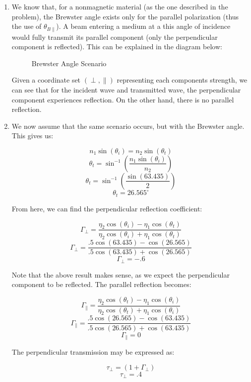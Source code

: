 \begin{enumerate}
\begin{enumerate}
      \item 

        We know that, for a nonmagnetic material (as the one described in the problem), the Brewster angle exists only for the parallel polarization (thus the use of $\theta_{B\parallel}$). A beam entering a medium at a this angle of incidence would fully transmit its parallel component (only the perpendicular component is reflected). This can be explained in the diagram below:

        \begin{figure}[h!]
          \centering
          
          \caption{Brewster Angle Scenario}
          \label{fig:2}
        \end{figure}

        Given a coordinate set $(\perp,\parallel)$ representing each components strength, we can see that for the incident wave and transmitted wave, the perpendicular component experiences reflection. On the other hand, there is no parallel reflection.

      \item 

        We now assume that the same scenario occurs, but with the Brewster angle. This gives us:

        $$n_1\sin(\theta_i)=n_2\sin(\theta_t)$$
        $$\theta_t=\sin^{-1}\left(\frac{n_1\sin(\theta_i)}{n_2}\right)$$
        $$\theta_t=\sin^{-1}\left(\frac{\sin(63.435)}{2}\right)$$
        $$\boxed{\theta_t=26.565^{\circ}}$$

        From here, we can find the perpendicular reflection coefficient:

        $$\Gamma_{\perp}=\frac{\eta_2\cos(\theta_i)-\eta_1\cos(\theta_t)}{\eta_2\cos(\theta_i)+\eta_1\cos(\theta_t)}$$
        $$\Gamma_{\perp}=\frac{.5\cos(63.435)-\cos(26.565)}{.5\cos(63.435)+\cos(26.565)}$$
        $$\boxed{\Gamma_{\perp}=-.6}$$

        Note that the above result makes sense, as we expect the perpendicular component to be reflected. The parallel reflection becomes:

        $$\Gamma_{\parallel}=\frac{\eta_2\cos(\theta_t)-\eta_1\cos(\theta_i)}{\eta_2\cos(\theta_t)+\eta_1\cos(\theta_i)}$$
        $$\Gamma_{\parallel}=\frac{.5\cos(26.565)-\cos(63.435)}{.5\cos(26.565)+\cos(63.435)}$$
        $$\boxed{\Gamma_{\parallel}=0}$$

        The perpendicular transmission may be expressed as:

        $$\tau_{\perp}=(1+\Gamma_{\perp})$$
        $$\boxed{\tau_{\perp}=.4}$$


\end{enumerate}
\end{enumerate}
